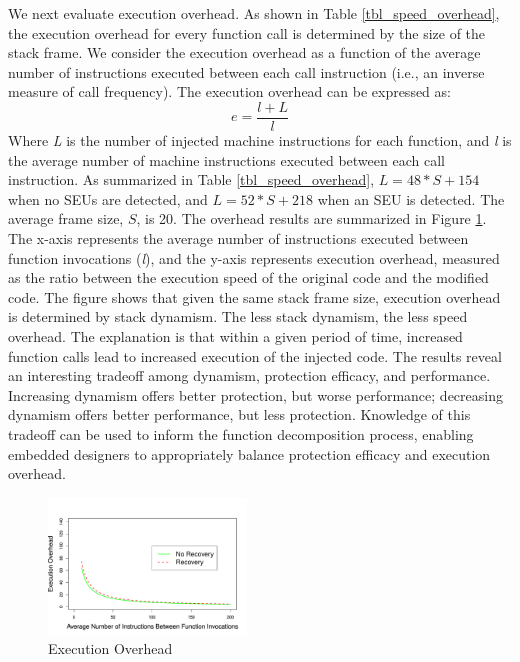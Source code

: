 We next evaluate execution overhead. As shown in Table \ref{tbl_speed_overhead}, the execution overhead for every function call is determined by the size of the stack frame. We consider the execution overhead as a function of the average number of instructions executed between each call instruction (i.e., an inverse measure of call frequency). The execution overhead can be expressed as:
\begin{equation}\label{eq_seu1}
e=\frac{l+L}{l}
\end{equation}
Where \textit{L} is the number of injected machine instructions for each function, and \textit{l} is the average number of machine instructions executed between each call instruction. As summarized in Table \ref{tbl_speed_overhead}, $L=48*S+154$ when no SEUs are detected, and $L=52*S+218$ when an SEU is detected. The average frame size, $S$, is 20. The overhead results are summarized in Figure \ref{fig:speed_overhead}. The x-axis represents the average number of instructions executed between function invocations (\textit{l}), and the y-axis represents execution overhead, measured as the ratio between the execution speed of the original code and the modified code. The figure shows that given the same stack frame size, execution overhead is determined by stack dynamism. The less stack dynamism, the less speed overhead. The explanation is that within a given period of time, increased function calls lead to increased execution of the injected code. The results reveal an interesting tradeoff among dynamism, protection efficacy, and performance. Increasing dynamism offers better protection, but worse performance; decreasing dynamism offers better performance, but less protection. Knowledge of this tradeoff can be used to inform the function decomposition process, enabling embedded designers to appropriately balance protection efficacy and execution overhead.
\begin{figure}
\centering
\includegraphics[width=0.47\textwidth]{figures/speed_overhead_line_chart_v1.pdf}
\vspace{5pt}
\caption{Execution Overhead}
\label{fig:speed_overhead}
\end{figure}

